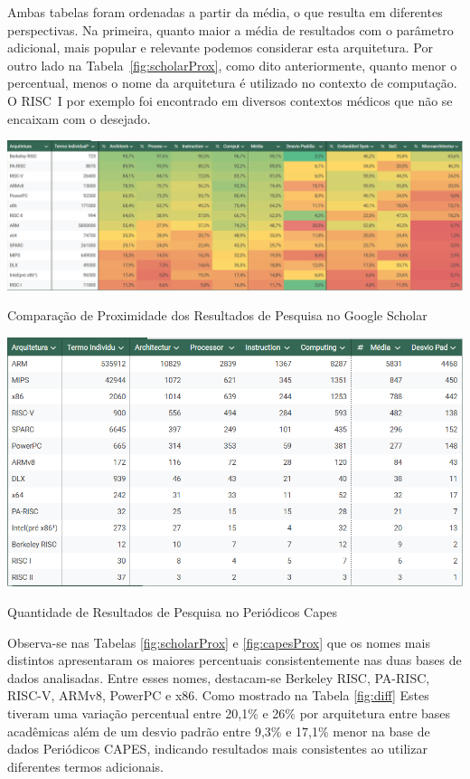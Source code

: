 \documentclass[
	article,			%
	11pt,				%
	oneside,			%
	a4paper,			%
	english,			%
	brazil,				%
	sumario=tradicional
	]{abntex2}
\begin{document}
Ambas tabelas foram ordenadas a partir da média, o que resulta em diferentes perspectivas. Na primeira, quanto maior a média de resultados com o parâmetro adicional, mais popular e relevante podemos considerar esta arquitetura. Por outro lado na Tabela~\ref{fig:scholarProx}, como dito anteriormente, quanto menor o percentual, menos o nome da arquitetura é utilizado no contexto de computação. O RISC~I por exemplo foi encontrado em diversos contextos médicos que não se encaixam com o desejado. 

\begin{table}[h]
    \centering
    \includegraphics[width=1\linewidth]{BaseDeDados/scholarProx.png}
    \caption{Comparação de Proximidade dos Resultados de Pesquisa no Google Scholar}
    \label{fig:scholarProx}
\end{table}

\begin{table}[H]
    \centering
    \includegraphics[width=1\linewidth]{BaseDeDados/capes.png}
    \caption{Quantidade de Resultados de Pesquisa no Periódicos Capes}
    \label{fig:capes}
\end{table}

Observa-se nas Tabelas \ref{fig:scholarProx} e \ref{fig:capesProx} que os nomes mais distintos apresentaram os maiores percentuais consistentemente nas duas bases de dados analisadas. Entre esses nomes, destacam-se Berkeley RISC, PA-RISC, RISC-V, ARMv8, PowerPC e x86. Como mostrado na Tabela \ref{fig:diff} Estes tiveram uma variação percentual entre 20,1\% e 26\% por arquitetura entre bases acadêmicas além de um desvio padrão entre 9,3\% e 17,1\% menor na base de dados Periódicos CAPES, indicando resultados mais consistentes ao utilizar diferentes termos adicionais.
\end{document}
